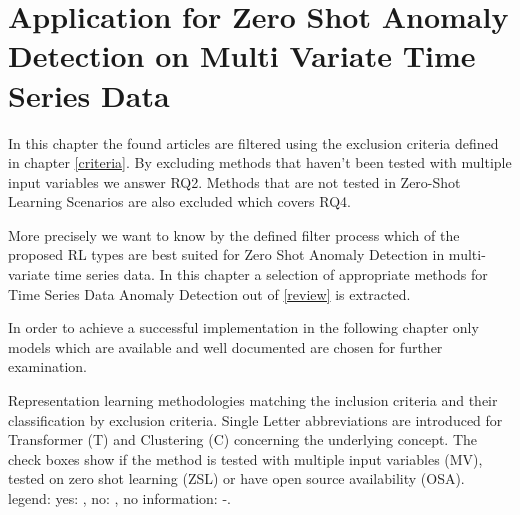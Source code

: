 \section{Application for Zero Shot Anomaly Detection on Multi Variate Time Series Data}\label{application}
In this chapter the found articles are filtered using the exclusion criteria defined in chapter \ref{criteria}. By excluding methods that haven't been tested with multiple input variables we answer RQ2. Methods that are not tested in Zero-Shot Learning Scenarios are also excluded which covers RQ4.

More precisely we want to know by the defined filter process which of the proposed RL types are best suited for Zero Shot Anomaly Detection in multi-variate time series data. In this chapter a selection of appropriate methods for Time Series Data Anomaly Detection out of \ref{review} is extracted.

 In order to achieve a successful implementation in the following chapter only models which are available and well documented are chosen for further examination.
 \begin{table}
   \caption{Representation learning methodologies matching the inclusion criteria and their classification by exclusion criteria. Single Letter abbreviations are introduced for Transformer (T) and Clustering (C) concerning the underlying concept. The check boxes show if the method is tested with multiple input variables (MV), tested on zero shot learning (ZSL) or have open source availability (OSA). legend: yes: \cmark, no: \xmark, no
information: -.}\label{tab_rl_methods}
   
 \end{table}
